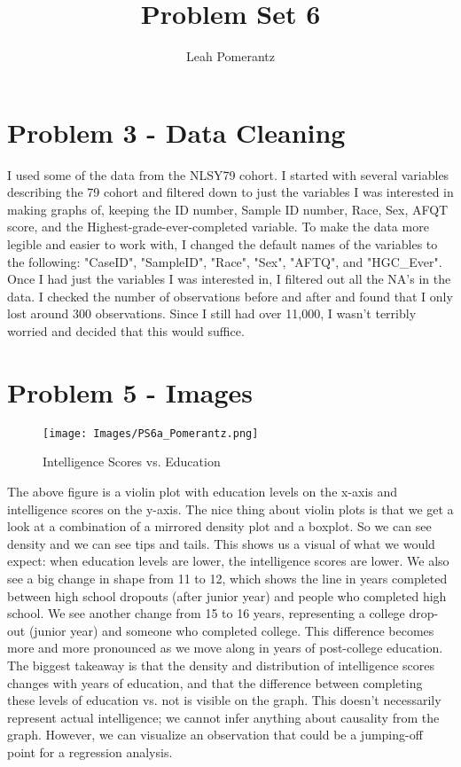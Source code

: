 \documentclass{article}
\title{Problem Set 6}
\author{Leah Pomerantz}
\begin{document}
\maketitle


\section{Problem 3 - Data Cleaning}

I used some of the data from the NLSY79 cohort. I started with several variables describing the 79 cohort and filtered down to just the variables I was interested in making graphs of, keeping the ID number, Sample ID number, Race, Sex, AFQT score, and the Highest-grade-ever-completed variable. To make the data more legible and easier to work with, I changed the default names of the variables to the following: "CaseID", "SampleID", "Race", "Sex", "AFTQ", and "HGC\_Ever". Once I had just the variables I was interested in, I filtered out all the NA's in the data. I checked the number of observations before and after and found that I only lost around 300 observations. Since I still had over 11,000, I wasn't terribly worried and decided that this would suffice.

\section{Problem 5 - Images}


\begin{figure}[htp]
    \centering
    \texttt{[image: Images/PS6a\_Pomerantz.png]}
    \caption{Intelligence Scores vs. Education}
    \label{fig:comp}
\end{figure}

The above figure is a violin plot with education levels on the x-axis and intelligence scores on the y-axis. The nice thing about violin plots is that we get a look at a combination of a mirrored density plot and a boxplot. So we can see density and we can see tips and tails. This shows us a visual of what we would expect: when education levels are lower, the intelligence scores are lower. We also see a big change in shape from 11 to 12, which shows the line in years completed between high school dropouts (after junior year) and people who completed high school. We see another change from 15 to 16 years, representing a college drop-out (junior year) and someone who completed college. This difference becomes more and more pronounced as we move along in years of post-college education. The biggest takeaway is that the density and distribution of intelligence scores changes with years of education, and that the difference between completing these levels of education vs. not is visible on the graph. This doesn't necessarily represent actual intelligence; we cannot infer anything about causality from the graph. However, we can visualize an observation that could be a jumping-off point for a regression analysis.
\end{document}
